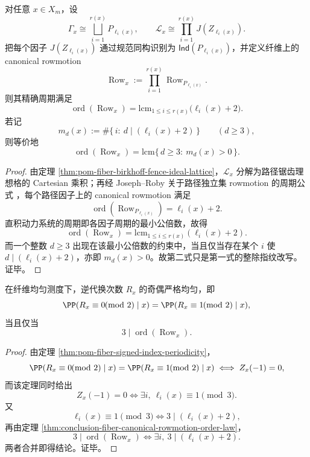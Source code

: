 \begin{theorem}\label{thm:conclusion-fiber-canonical-rowmotion-order-law}
对任意 \(x\in X_m\)，设
\[
\Gamma_x\cong \bigsqcup_{i=1}^{r(x)}P_{\ell_i(x)},
\qquad
\mathcal L_x\cong \prod_{i=1}^{r(x)}J(Z_{\ell_i(x)}).
\]
把每个因子 \(J(Z_{\ell_i(x)})\) 通过规范同构识别为 \(\mathsf{Ind}(P_{\ell_i(x)})\)，并定义纤维上的 canonical rowmotion
\[
\operatorname{Row}_x:=\prod_{i=1}^{r(x)}\operatorname{Row}_{P_{\ell_i(x)}}.
\]
则其精确周期满足
\[
\operatorname{ord}(\operatorname{Row}_x)=\mathrm{lcm}_{1\le i\le r(x)}\bigl(\ell_i(x)+2\bigr).
\]
若记
\[
m_d(x):=\#\{\,i:\ d\mid (\ell_i(x)+2)\,\}
\qquad (d\ge 3),
\]
则等价地
\[
\operatorname{ord}(\operatorname{Row}_x)
=
\mathrm{lcm}\{\,d\ge 3:\ m_d(x)>0\,\}.
\]
\end{theorem}
\begin{proof}
由定理 \ref{thm:pom-fiber-birkhoff-fence-ideal-lattice}，\(\mathcal L_x\) 分解为路径锯齿理想格的 Cartesian 乘积；再经 Joseph--Roby 关于路径独立集 rowmotion 的周期公式 \cite{JosephRoby2018TogglingIndependentSetsPath}，每个路径因子上的 canonical rowmotion 满足
\[
\operatorname{ord}(\operatorname{Row}_{P_{\ell_i(x)}})=\ell_i(x)+2.
\]
直积动力系统的周期即各因子周期的最小公倍数，故得
\[
\operatorname{ord}(\operatorname{Row}_x)=\mathrm{lcm}_{1\le i\le r(x)}(\ell_i(x)+2).
\]
而一个整数 \(d\ge 3\) 出现在该最小公倍数的约束中，当且仅当存在某个 \(i\) 使 \(d\mid(\ell_i(x)+2)\)，亦即 \(m_d(x)>0\)。故第二式只是第一式的整除指纹改写。证毕。
\end{proof}

\begin{corollary}[三扭结与奇偶平衡的等价判据]\label{cor:conclusion-fiber-parity-balance-rowmotion-three-torsion}
在纤维均匀测度下，逆代换次数 \(R_x\) 的奇偶严格均匀，即
\[
\PP(R_x\equiv 0\!\!\!\pmod 2\mid x)
=
\PP(R_x\equiv 1\!\!\!\pmod 2\mid x),
\]
当且仅当
\[
3\mid \operatorname{ord}(\operatorname{Row}_x).
\]
\end{corollary}
\begin{proof}
由定理 \ref{thm:pom-fiber-signed-index-periodicity}，
\[
\PP(R_x\equiv 0\!\!\!\pmod 2\mid x)
=
\PP(R_x\equiv 1\!\!\!\pmod 2\mid x)
\iff
Z_x(-1)=0,
\]
而该定理同时给出
\[
Z_x(-1)=0
\iff
\exists i,\ \ell_i(x)\equiv 1\pmod 3.
\]
又
\[
\ell_i(x)\equiv 1\pmod 3
\iff
3\mid (\ell_i(x)+2),
\]
再由定理 \ref{thm:conclusion-fiber-canonical-rowmotion-order-law}，
\[
3\mid \operatorname{ord}(\operatorname{Row}_x)
\iff
\exists i,\ 3\mid (\ell_i(x)+2).
\]
两者合并即得结论。证毕。
\end{proof}

